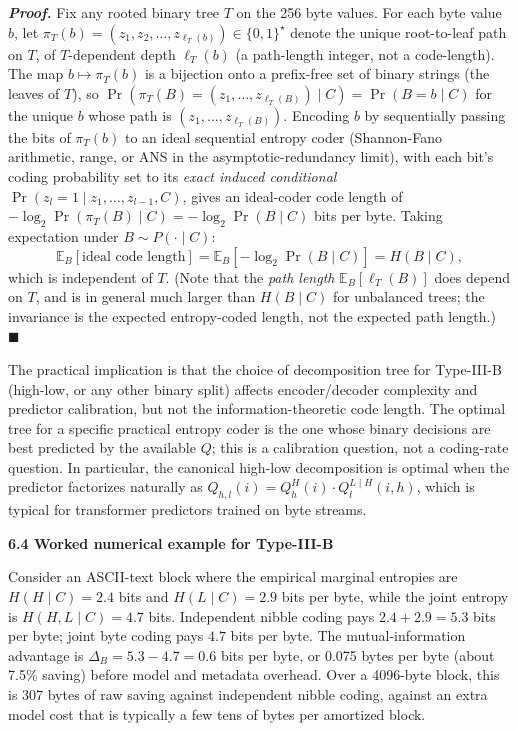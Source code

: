 \documentclass[
]{article}
\begin{document}
\emph{\textbf{Proof.}} Fix any rooted binary tree $T$ on the 256
byte values. For each byte value $b$, let $\pi_T(b) = (z_1, z_2,
\ldots, z_{\ell_T(b)}) \in \{0,1\}^\star$ denote the unique
root-to-leaf path on $T$, of $T$-dependent depth $\ell_T(b)$ (a
path-length integer, not a code-length). The map $b \mapsto
\pi_T(b)$ is a bijection onto a prefix-free set of binary strings
(the leaves of $T$), so
$\Pr(\pi_T(B) = (z_1, \dots, z_{\ell_T(B)}) \mid C) = \Pr(B = b \mid C)$
for the unique $b$ whose path is $(z_1, \dots, z_{\ell_T(B)})$.
Encoding $b$ by sequentially passing the bits of $\pi_T(b)$ to an
ideal sequential entropy coder (Shannon-Fano arithmetic, range, or
ANS in the asymptotic-redundancy limit), with each bit's coding
probability set to its \emph{exact induced conditional}
$\Pr(z_l = 1 \mid z_1, \ldots, z_{l-1}, C)$, gives an
ideal-coder code length of
$-\log_2 \Pr(\pi_T(B) \mid C) = -\log_2 \Pr(B \mid C)$ bits per
byte. Taking expectation under $B \sim P(\cdot \mid C)$:
\[
\mathbb{E}_B[\text{ideal code length}] = \mathbb{E}_B[-\log_2 \Pr(B \mid C)] = H(B \mid C),
\]
which is independent of $T$. (Note that the \emph{path length}
$\mathbb{E}_B[\ell_T(B)]$ does depend on $T$, and is in general
much larger than $H(B \mid C)$ for unbalanced trees; the
invariance is the expected entropy-coded length, not the expected
path length.) \hfill$\blacksquare$

The practical implication is that the choice of decomposition tree
for Type-III-B (high-low, or any other binary split) affects
encoder/decoder complexity and predictor calibration, but not the
information-theoretic code length. The optimal tree for a specific
practical entropy coder is the one whose binary decisions are best
predicted by the available $Q$; this is a calibration question, not a
coding-rate question. In particular, the canonical high-low
decomposition is optimal when the predictor factorizes naturally as
$Q_{h,l}(i) = Q^H_h(i) \cdot Q^{L \mid H}_l(i, h)$, which is typical
for transformer predictors trained on byte streams.

\textbf{6.4 Worked numerical example for Type-III-B}

Consider an ASCII-text block where the empirical marginal entropies
are $H(H \mid C) = 2.4$ bits and $H(L \mid C) = 2.9$ bits per byte,
while the joint entropy is $H(H, L \mid C) = 4.7$ bits. Independent
nibble coding pays $2.4 + 2.9 = 5.3$ bits per byte; joint byte coding
pays $4.7$ bits per byte. The mutual-information advantage is
$\Delta_B = 5.3 - 4.7 = 0.6$ bits per byte, or 0.075 bytes per byte
(about 7.5\% saving) before model and metadata overhead. Over a
4096-byte block, this is 307 bytes of raw saving against independent
nibble coding, against an extra model cost that is typically a few
tens of bytes per amortized block.
\end{document}
